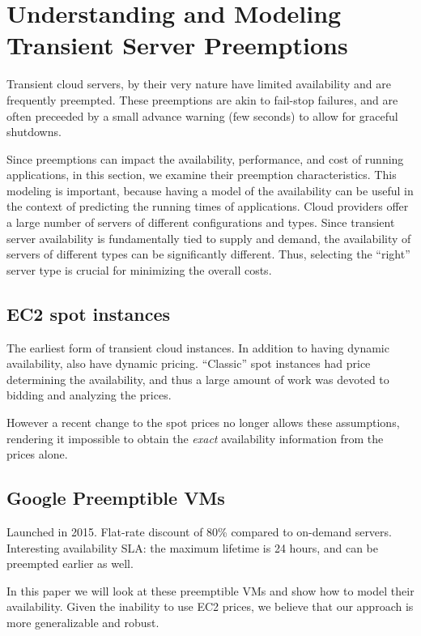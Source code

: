 \section{Understanding and Modeling Transient Server Preemptions}

Transient cloud servers, by their very nature have limited availability and are frequently preempted.
These preemptions are akin to fail-stop failures, and are often preceeded by a small advance warning (few seconds) to allow for graceful shutdowns.

Since preemptions can impact the availability, performance, and cost of running applications, in this section, we examine their preemption characteristics.
This modeling is important, because having a model of the availability can be useful in the context of predicting the running times of applications.
Cloud providers offer a large number of servers of different configurations and types.
Since transient server availability is fundamentally tied to supply and demand, the availability of servers of different types can be significantly different. 
Thus, selecting the ``right'' server type is crucial for minimizing the overall costs. 




\subsection{EC2 spot instances}

The earliest form of transient cloud instances.
In addition to having dynamic availability, also have dynamic pricing.
``Classic'' spot instances had price determining the availability, and thus a large amount of work was devoted to bidding and analyzing the prices.

However a recent change to the spot prices no longer allows these assumptions, rendering it impossible to obtain the \emph{exact} availability information from the prices alone.


\subsection{Google Preemptible VMs}

Launched in 2015.
Flat-rate discount of 80\% compared to on-demand servers.
Interesting availability SLA: the maximum lifetime is 24 hours, and can be preempted earlier as well.

In this paper we will look at these preemptible VMs and show how to model their availability.
Given the inability to use EC2 prices, we believe that our approach is more generalizable and robust.

